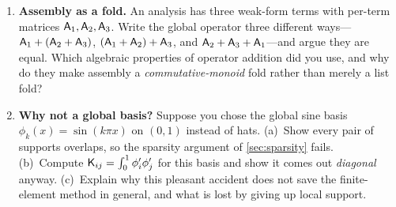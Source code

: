 \begin{enumerate}[nosep]
  \item \textbf{Assembly as a fold.} An analysis has three weak-form terms with
  per-term matrices $\mathsf{A}_1,\mathsf{A}_2,\mathsf{A}_3$. Write the global operator
  three different ways---$\mathsf{A}_1+(\mathsf{A}_2+\mathsf{A}_3)$,
  $(\mathsf{A}_1+\mathsf{A}_2)+\mathsf{A}_3$, and $\mathsf{A}_2+\mathsf{A}_3+\mathsf{A}_1$---and
  argue they are equal. Which algebraic properties of operator addition did you
  use, and why do they make assembly a \emph{commutative-monoid} fold rather than
  merely a list fold?

  \item \textbf{Why not a global basis?} Suppose you chose the global sine basis
  $\phi_k(x)=\sin(k\pi x)$ on $(0,1)$ instead of hats. (a)~Show every pair of
  supports overlaps, so the sparsity argument of \cref{sec:sparsity} fails.
  (b)~Compute $\mathsf{K}_{ij}=\int_0^1\phi_i'\phi_j'$ for this basis and show it
  comes out \emph{diagonal} anyway. (c)~Explain why this pleasant accident does
  not save the finite-element method in general, and what is lost by giving up
  local support.
\end{enumerate}
